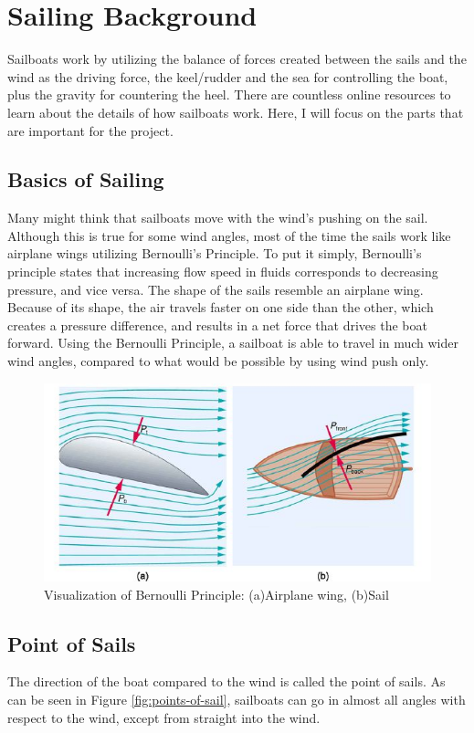 \documentclass[12pt,twoside]{report}
\begin{document}
\section{Sailing Background}
Sailboats work by utilizing the balance of forces created between the sails and the wind as the driving force, the keel/rudder and the sea for controlling the boat, plus the gravity for countering the heel. There are countless online resources to learn about the details of how sailboats work. Here, I will focus on the parts that are important for the project.

\subsection{Basics of Sailing}
Many might think that sailboats move with the wind's pushing on the sail. Although this is true for some wind angles, most of the time the sails work like airplane wings utilizing Bernoulli's Principle. To put it simply, Bernoulli's principle \cite{wiki:bernoulli} states that increasing flow speed in fluids corresponds to decreasing pressure, and vice versa. The shape of the sails resemble an airplane wing. Because of its shape, the air travels faster on one side than the other, which creates a pressure difference, and results in a net force that drives the boat forward. Using the Bernoulli Principle, a sailboat is able to travel in much wider wind angles, compared to what would be possible by using wind push only.

\begin{figure}[h]
\centering
\includegraphics[width = 0.6\hsize]{figures/sailing/sail-bernoulli.jpg}
\caption{Visualization of Bernoulli Principle: (a)Airplane wing, (b)Sail \cite{bernoulli}}
\label{fig:bernoulli}
\end{figure}

\subsection{Point of Sails}
The direction of the boat compared to the wind is called the point of sails. As can be seen in Figure \ref{fig:points-of-sail}, sailboats can go in almost all angles with respect to the wind, except from straight into the wind.
\end{document}
